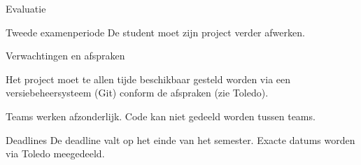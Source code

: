 \documentclass{studiewijzer}
\begin{document}
\begin{categorybox}{Evaluatie}
    \begin{category}{Tweede examenperiode}
        De student moet zijn project verder afwerken.
    \end{category}

    \begin{category}{Verwachtingen en afspraken}
        \begin{items}
            \item Het project moet te allen tijde beschikbaar gesteld worden via een versiebeheersysteem (Git) conform de afspraken (zie Toledo).
            \item Teams werken afzonderlijk. Code kan niet gedeeld worden tussen teams.
        \end{items}
    \end{category}

    \begin{category}{Deadlines}
        De deadline valt op het einde van het semester. Exacte datums worden via Toledo meegedeeld.
    \end{category}
\end{categorybox}
\end{document}
